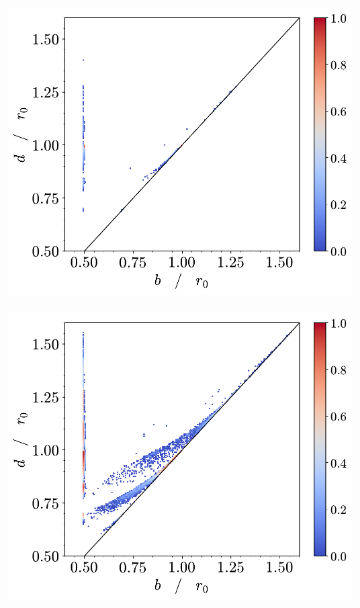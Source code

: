 \begin{figure}[tb]
      \begin{subfigure}[b]{0.48\textwidth}
         \centering
         \includegraphics[width=\textwidth]{./figures/ph/t-4500_tr_pd.pdf}
         \caption{}
         \label{fig:trpda}
     \end{subfigure}
     \hfill
      \begin{subfigure}[b]{0.48\textwidth}
         \centering
         \includegraphics[width=\textwidth]{./figures/ph/t-3600_tr_pd.pdf}
         \caption{}
         \label{fig:trpdb}
     \end{subfigure}
     \hfill
     

\end{figure}
